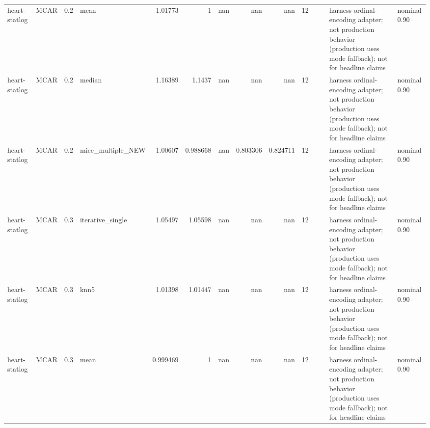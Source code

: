 \begin{table}[ht]
\begin{tabular}{llrlrrrrrrllll}
 heart-statlog        & MCAR        &         0.2 & mean              &       1.01773  &             1        &               nan        &                     nan        &                       nan        &        12 &                    &                                         & harness ordinal-encoding adapter; not production behavior (production uses mode fallback); not for headline claims & nominal 0.90              \\
 heart-statlog        & MCAR        &         0.2 & median            &       1.16389  &             1.1437   &               nan        &                     nan        &                       nan        &        12 &                    &                                         & harness ordinal-encoding adapter; not production behavior (production uses mode fallback); not for headline claims & nominal 0.90              \\
 heart-statlog        & MCAR        &         0.2 & mice\_multiple\_NEW &       1.00607  &             0.988668 &               nan        &                       0.803306 &                         0.824711 &        12 &                    &                                         & harness ordinal-encoding adapter; not production behavior (production uses mode fallback); not for headline claims & nominal 0.90              \\
 heart-statlog        & MCAR        &         0.3 & iterative\_single  &       1.05497  &             1.05598  &               nan        &                     nan        &                       nan        &        12 &                    &                                         & harness ordinal-encoding adapter; not production behavior (production uses mode fallback); not for headline claims & nominal 0.90              \\
 heart-statlog        & MCAR        &         0.3 & knn5              &       1.01398  &             1.01447  &               nan        &                     nan        &                       nan        &        12 &                    &                                         & harness ordinal-encoding adapter; not production behavior (production uses mode fallback); not for headline claims & nominal 0.90              \\
 heart-statlog        & MCAR        &         0.3 & mean              &       0.999469 &             1        &               nan        &                     nan        &                       nan        &        12 &                    &                                         & harness ordinal-encoding adapter; not production behavior (production uses mode fallback); not for headline claims & nominal 0.90              \\

\end{tabular}
\end{table}
